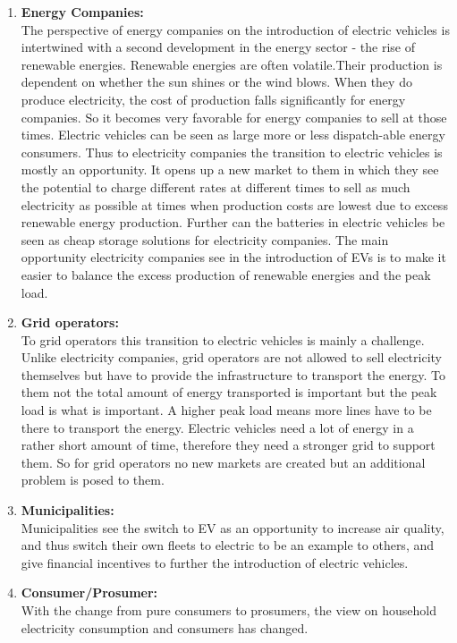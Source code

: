 \documentclass[a4paper]{article}
\begin{document}
\begin{enumerate}
 \item \textbf{Energy Companies:}\\
 The perspective of energy companies on the introduction of electric vehicles is intertwined with a second 
 development in the energy sector - the rise of renewable energies. Renewable energies are often volatile.Their production is 
 dependent on whether the sun shines or the wind blows. When they do produce electricity, the cost of production falls significantly 
 for energy companies. So it becomes very favorable for energy companies to sell at those times. 
 Electric vehicles can be seen as large more or less dispatch-able energy consumers. 
 Thus to electricity companies the transition to electric vehicles is mostly an opportunity. It opens up a new market to them 
 in which they see the potential to charge different rates at different times to sell as much electricity as possible 
 at times when production costs are lowest due to excess renewable energy production. Further can the batteries in 
 electric vehicles be seen as cheap storage solutions for electricity companies. The main opportunity electricity 
 companies see in the introduction of EVs is to make it easier to balance the excess production of renewable energies
 and the peak load.
 \item \textbf{Grid operators:}\\
 To grid operators this transition to electric vehicles is mainly a challenge. 
 Unlike electricity companies, grid operators are not allowed to sell electricity themselves but have to provide the 
 infrastructure to transport the energy. To them not the total amount of energy transported is important but the 
 peak load is what is important. A higher peak load means more lines have to be there to transport the energy. 
 Electric vehicles need a lot of energy in a rather short amount of time, therefore they need a stronger grid to support 
 them. So for grid operators no new markets are created but an additional problem is posed to them. 
 \item \textbf{Municipalities:}\\
 Municipalities see the switch to EV as an opportunity to increase air quality, and thus switch their own fleets to 
 electric to be an example to others, and give financial incentives to further the introduction of electric vehicles. 
 \item \textbf{Consumer/Prosumer:}\\
 With the change from pure consumers to prosumers, the view on household electricity consumption and consumers has changed. 

\end{enumerate}
\end{document}
